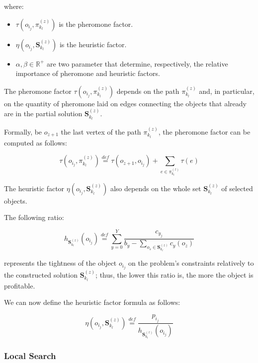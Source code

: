 \documentclass[12pt,a4paper]{report}
\newcommand{\mathDef}{\overset{\textit{def}}{=}}
\newcommand{\Rplus}{\mathbb{R}^+}
\theoremstyle{definition}
\begin{document}
where:

\begin{itemize}
	\item $\tau( o_{i_j}, \pi_{k_l}^{(z)})$ is the pheromone factor.
	\item $\eta( o_{i_j}, \textbf{S}_{k_l}^{(z)})$ is the heuristic factor.
	\item $\alpha, \beta \in \Rplus$ are two parameter that determine, respectively, the relative importance of pheromone and heuristic factors.
\end{itemize}

The pheromone factor $\tau( o_{i_j}, \pi_{k_l}^{(z)})$ depends on the path $\pi_{k_l}^{(z)}$ and, in particular, on the quantity of pheromone laid on edges connecting the objects that already are in the partial solution $\textbf{S}_{k_l}^{(z)}$.

Formally, be $o_{z+1}$ the last vertex of the path $\pi_{k_l}^{(z)}$, the pheromone factor can be computed as follows:

\begin{equation}
	\tau( o_{i_j}, \pi_{k_l}^{(z)}) \mathDef \tau(o_{z+1}, o_{i_j}) + \sum_{e \in \pi_{k_l}^{(z)}} \tau(e) 
\end{equation}

The heuristic factor $\eta( o_{i_j}, \textbf{S}_{k_l}^{(z)})$ also depends on the whole set $\textbf{S}_{k_l}^{(z)}$ of selected objects. 



The following ratio:

\begin{equation}
	h_{\textbf{S}_{k_l}^{(z)}}(o_{i_j}) \mathDef \displaystyle \sum_{y=0}^{Y} \frac{c_{y_j}}{\displaystyle  b_y - \sum_{o_s \in \textbf{S}_{k_l}^{(z)}} c_y(o_z)}
\end{equation}

represents the tightness of the object $o_{i_j}$ on the problem's constraints relatively to the constructed solution $\textbf{S}_{k_l}^{(z)}$; thus, the lower this ratio is, the
more the object is profitable.

We can now define the heuristic factor formula as follows:

\begin{equation}
	\eta( o_{i_j}, \textbf{S}_{k_l}^{(z)}) \mathDef \frac{p_{i_j}}{h_{\textbf{S}_{k_l}^{(z)}}(o_{i_j})}
\end{equation}


\subsubsection{Local Search}
\end{document}
